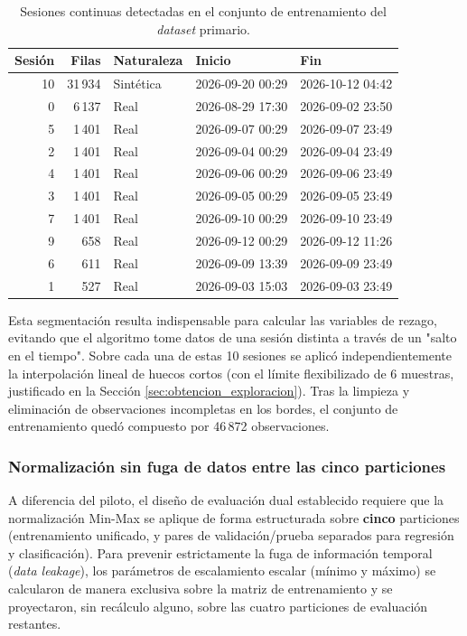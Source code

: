 \documentclass[12pt]{report}
\begin{document}
\begin{table}[H]
    \centering
    \small
    \begin{tabular}{|r|r|l|l|l|}
        \hline
        \textbf{Sesión} & \textbf{Filas} & \textbf{Naturaleza} & \textbf{Inicio} & \textbf{Fin} \\
        \hline
        10 & 31\,934 & Sintética & 2026-09-20 00:29 & 2026-10-12 04:42 \\
        0  & 6\,137  & Real & 2026-08-29 17:30 & 2026-09-02 23:50 \\
        5  & 1\,401  & Real & 2026-09-07 00:29 & 2026-09-07 23:49 \\
        2  & 1\,401  & Real & 2026-09-04 00:29 & 2026-09-04 23:49 \\
        4  & 1\,401  & Real & 2026-09-06 00:29 & 2026-09-06 23:49 \\
        3  & 1\,401  & Real & 2026-09-05 00:29 & 2026-09-05 23:49 \\
        7  & 1\,401  & Real & 2026-09-10 00:29 & 2026-09-10 23:49 \\
        9  & 658    & Real & 2026-09-12 00:29 & 2026-09-12 11:26 \\
        6  & 611    & Real & 2026-09-09 13:39 & 2026-09-09 23:49 \\
        1  & 527    & Real & 2026-09-03 15:03 & 2026-09-03 23:49 \\
        \hline
    \end{tabular}
    \caption{Sesiones continuas detectadas en el conjunto de entrenamiento del \textit{dataset} primario.}
    \label{tab:sesiones_train}
\end{table}

Esta segmentación resulta indispensable para calcular las variables de rezago, evitando que el algoritmo tome datos de una sesión distinta a través de un "salto en el tiempo". Sobre cada una de estas 10 sesiones se aplicó independientemente la interpolación lineal de huecos cortos (con el límite flexibilizado de 6 muestras, justificado en la Sección 
\ref{sec:obtencion_exploracion}). Tras la limpieza y eliminación de observaciones incompletas en los bordes, el conjunto de entrenamiento quedó compuesto por 46\,872 observaciones.

\subsubsection*{Normalización sin fuga de datos entre las cinco particiones}
A diferencia del piloto, el diseño de evaluación dual establecido requiere que la normalización Min-Max se aplique de forma estructurada sobre \textbf{cinco} particiones (entrenamiento unificado, y pares de validación/prueba separados para regresión y clasificación). Para prevenir estrictamente la fuga de información temporal (\textit{data leakage}), los parámetros de escalamiento escalar (mínimo y máximo) se calcularon de manera exclusiva sobre la matriz de entrenamiento y se proyectaron, sin recálculo alguno, sobre las cuatro particiones de evaluación restantes.
\end{document}
